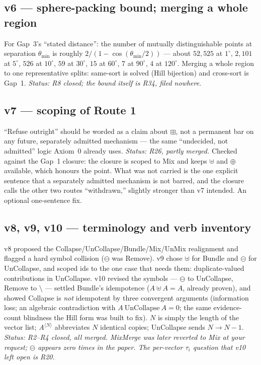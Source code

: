\documentclass[11pt]{article}
\begin{document}
\subsection*{v6 --- sphere-packing bound; merging a whole region}
For Gap~3's ``stated distance'': the number of mutually
distinguishable points at separation $\theta_{\min}$ is roughly
$2/(1-\cos(\theta_{\min}/2))$ --- about $52{,}525$ at $1^\circ$,
$2{,}101$ at $5^\circ$, $526$ at $10^\circ$, $59$ at $30^\circ$, $15$
at $60^\circ$, $7$ at $90^\circ$, $4$ at $120^\circ$. Merging a
whole region to one representative splits: same-sort is solved
(Hill bijection) and cross-sort is Gap~1. \emph{Status: R8 closed;
the bound itself is R34, filed nowhere.}

\subsection*{v7 --- scoping of Route 1}
``Refuse outright'' should be worded as a claim about $\boxplus$,
not a permanent bar on any future, separately admitted mechanism ---
the same ``undecided, not admitted'' logic Axiom~0 already uses.
\emph{Status: R26, partly merged.} Checked against the Gap~1
closure: the closure is scoped to Mix and keeps $\uplus$ and
$\oplus$ available, which honours the point. What was not carried is
the one explicit sentence that a separately admitted mechanism is not
barred, and the closure calls the other two routes ``withdrawn,''
slightly stronger than v7 intended. An optional one-sentence fix.

\subsection*{v8, v9, v10 --- terminology and verb inventory}
v8 proposed the Collapse/UnCollapse/Bundle/Mix/UnMix realignment and
flagged a hard symbol collision ($\ominus$ was Remove). v9 chose
$\uplus$ for Bundle and $\circleddash$ for UnCollapse, and scoped
ids to the one case that needs them: duplicate-valued contributions
in UnCollapse. v10 revised the symbols --- $\ominus$ to UnCollapse,
Remove to $\setminus$ --- settled Bundle's idempotence
($A\uplus A=A$, already proven), and showed Collapse is
\emph{not} idempotent by three convergent arguments (information
loss; an algebraic contradiction with $A\ \text{UnCollapse}\ A=0$;
the same evidence-count blindness the Hill form was built to fix).
$N$ is simply the length of the vector list; $A^{\langle N\rangle}$
abbreviates $N$ identical copies; UnCollapse sends $N\to N-1$.
\emph{Status: R2--R4 closed, all merged. MixMerge was later reverted
to Mix at your request; $\circleddash$ appears zero times in the
paper. The per-vector $\tau_i$ question that v10 left open is R20.}
\end{document}
